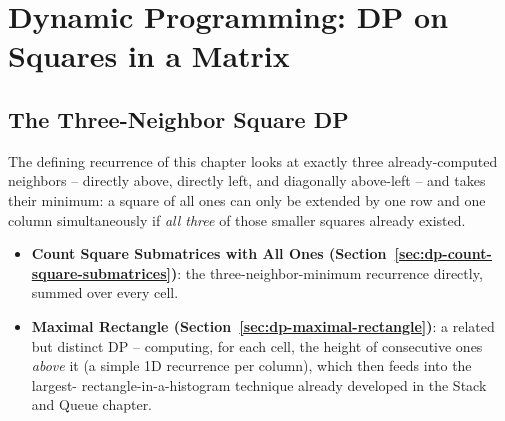 \chapter{Dynamic Programming: DP on Squares in a Matrix}

\section{The Three-Neighbor Square DP}
\label{sec:dp-squares-intro}

The defining recurrence of this chapter looks at exactly three already-computed
neighbors -- directly above, directly left, and diagonally above-left --
and takes their minimum: a square of all ones can only be extended by
one row and one column simultaneously if \emph{all three} of those
smaller squares already existed.

\begin{patternbox}
\begin{itemize}
  \item \textbf{Count Square Submatrices with All Ones (Section~\ref{sec:dp-count-square-submatrices})}:
        the three-neighbor-minimum recurrence directly, summed over
        every cell.
  \item \textbf{Maximal Rectangle (Section~\ref{sec:dp-maximal-rectangle})}:
        a related but distinct DP -- computing, for each cell, the
        height of consecutive ones \emph{above} it (a simple 1D
        recurrence per column), which then feeds into the largest-
        rectangle-in-a-histogram technique already developed in the
        Stack and Queue chapter.
\end{itemize}
\end{patternbox}

\newpage



